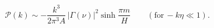 \begin{equation}\label{eq:powerspectrum}
  \mathcal{P}(k)\sim-\frac{k^3}{2\pi^3 A}\,\left|\Gamma(\nu)\right|^2
  \sinh \frac{\pi m}{H}
\quad\quad (\text{for}\, {}-k \eta\ll 1).
\end{equation} 
